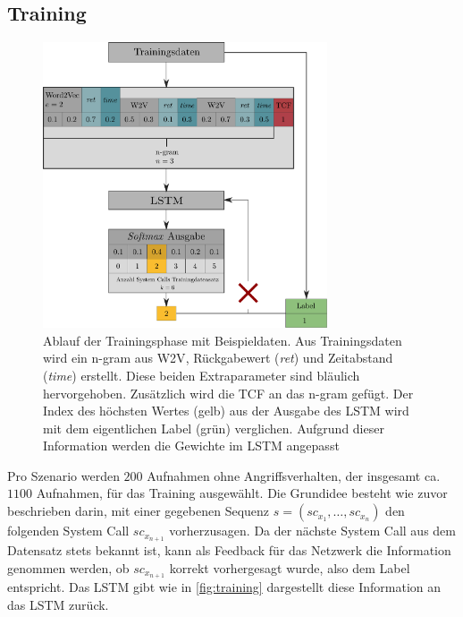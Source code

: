         \subsection{Training}\label{sec:Training}
            \begin{figure}
                \centering
                \includegraphics[width=0.75\textwidth]{images/Process_overview.pdf}
                \caption[Algorithmus - Ablauf Trainingsphase]{Ablauf der Trainingsphase mit Beispieldaten.
                        Aus Trainingsdaten wird ein n-gram aus \ac{W2V}, Rückgabewert (\textit{ret}) und Zeitabstand (\textit{time}) erstellt.
                        Diese beiden Extraparameter sind bläulich hervorgehoben.
                        Zusätzlich wird die \ac{TCF} an das n-gram gefügt.
                        Der Index des höchsten Wertes (gelb) aus der Ausgabe des \ac{LSTM} wird mit dem eigentlichen Label (grün) verglichen.
                        Aufgrund dieser Information werden die Gewichte im \ac{LSTM} angepasst}\label{fig:training}
            \end{figure}
            Pro Szenario werden $200$ Aufnahmen ohne Angriffsverhalten, der insgesamt ca.\ $1100$ Aufnahmen, für das Training ausgewählt.
            Die Grund\-idee besteht wie zuvor beschrieben darin, mit einer gegebenen Sequenz $s = (sc_{x_1},\dots,sc_{x_n})$ den folgenden System Call $sc_{x_{n+1}}$ vorherzusagen. 
            Da der nächste System Call aus dem Datensatz stets bekannt ist, kann als Feedback für das Netzwerk die Information genommen werden, ob $sc_{x_{n+1}}$ korrekt vorhergesagt wurde, also dem Label entspricht.
            Das \ac{LSTM} gibt wie in \autoref{fig:training} dargestellt diese Information an das \ac{LSTM} zurück.

